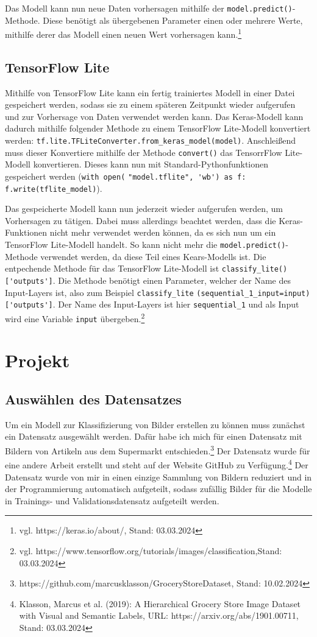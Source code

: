\documentclass[11pt,oneside]{report}
\begin{document}
Das Modell kann nun neue Daten vorhersagen mithilfe der \verb+model.predict()+-Methode. Diese benötigt als übergebenen Parameter einen oder mehrere Werte, mithilfe derer das Modell einen neuen Wert vorhersagen kann.\footnote{vgl. https://keras.io/about/, Stand: 03.03.2024}

\section{TensorFlow Lite}
Mithilfe von TensorFlow Lite kann ein fertig trainiertes Modell in einer Datei gespeichert werden, sodass sie zu einem späteren Zeitpunkt wieder aufgerufen und zur Vorhersage von Daten verwendet werden kann. Das Keras-Modell kann dadurch mithilfe folgender Methode zu einem TensorFlow Lite-Modell konvertiert werden: \verb+tf.lite.TFLiteConverter.from_keras_model(model)+. Anschleißend muss dieser Konvertiere mithilfe der Methode \verb+convert()+ das TensorrFlow Lite-Modell konvertieren. Dieses kann nun mit Standard-Pythonfunktionen gespeichert werden (\verb+with open(+ \verb+"model.tflite", 'wb') as f: f.write(tflite_model)+).

Das gespeicherte Modell kann nun jederzeit wieder aufgerufen werden, um Vorhersagen zu tätigen. Dabei muss allerdings beachtet werden, dass die Keras-Funktionen nicht mehr verwendet werden können, da es sich nun um ein TensorFlow Lite-Modell handelt. So kann nicht mehr die \verb+model.predict()+-Methode verwendet werden, da diese Teil eines Kears-Modells ist. Die entpechende Methode für das TensorFlow Lite-Modell ist \verb+classify_lite()['outputs']+. Die Methode benötigt einen Parameter, welcher der Name des Input-Layers ist, also zum Beispiel \verb+classify_lite+ \verb+(sequential_1_input=input)['outputs']+. Der Name des Input-Layers ist hier \verb+sequential_1+ und als Input wird eine Variable \verb+input+ übergeben.\footnote{vgl. https://www.tensorflow.org/tutorials/images/classification,Stand: 03.03.2024}


\chapter{Projekt}

\section{Auswählen des Datensatzes}
Um ein Modell zur Klassifizierung von Bilder erstellen zu können muss zunächst ein Datensatz ausgewählt werden. Dafür habe ich mich für einen Datensatz mit Bildern von Artikeln aus dem Supermarkt entschieden.\footnote{https://github.com/marcusklasson/GroceryStoreDataset, Stand: 10.02.2024} Der Datensatz wurde für eine andere Arbeit erstellt und steht auf der Website GitHub zu Verfügung.\footnote{Klasson, Marcus et al. (2019): A Hierarchical Grocery Store Image Dataset with Visual and Semantic Labels, URL: https://arxiv.org/abs/1901.00711, Stand: 03.03.2024} Der Datensatz wurde von mir in einen einzige Sammlung von Bildern reduziert und in der Programmierung automatisch aufgeteilt, sodass zufällig Bilder für die Modelle in Trainings- und Validationsdatensatz aufgeteilt werden.
\end{document}
